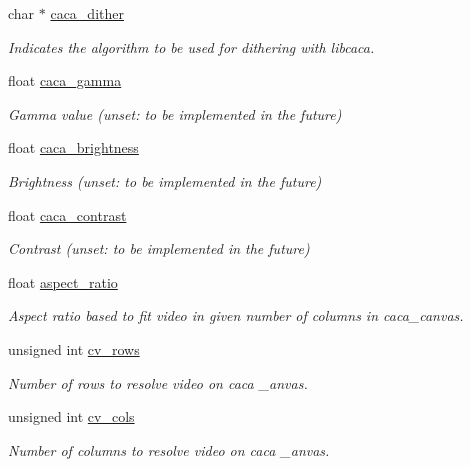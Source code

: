 \begin{DoxyCompactItemize}
char $\ast$ \hyperlink{structvideo__params__s_ac064547d5eda8f8516a88922ca28ae5c}{caca\-\_\-dither}
\begin{DoxyCompactList}\small\item\em \-Indicates the algorithm to be used for dithering with libcaca. \end{DoxyCompactList}\item 
float \hyperlink{structvideo__params__s_a041f29eefbb3860f3b56eb94d96a8f94}{caca\-\_\-gamma}
\begin{DoxyCompactList}\small\item\em \-Gamma value (unset\-: to be implemented in the future) \end{DoxyCompactList}\item 
float \hyperlink{structvideo__params__s_ab2e01e01864e7fb07fdc3ec727edf8ab}{caca\-\_\-brightness}
\begin{DoxyCompactList}\small\item\em \-Brightness (unset\-: to be implemented in the future) \end{DoxyCompactList}\item 
float \hyperlink{structvideo__params__s_aa080edd1e1614a24f4496118ae33bfbc}{caca\-\_\-contrast}
\begin{DoxyCompactList}\small\item\em \-Contrast (unset\-: to be implemented in the future) \end{DoxyCompactList}\item 
float \hyperlink{structvideo__params__s_a1b7019b0aa1838ed55f41cd299cd7fb3}{aspect\-\_\-ratio}
\begin{DoxyCompactList}\small\item\em \-Aspect ratio based to fit video in given number of columns in caca\-\_\-canvas. \end{DoxyCompactList}\item 
unsigned int \hyperlink{structvideo__params__s_aec78c2ac6a99bfb627d77fe7c533541d}{cv\-\_\-rows}
\begin{DoxyCompactList}\small\item\em \-Number of rows to resolve video on caca \-\_\-anvas. \end{DoxyCompactList}\item 
unsigned int \hyperlink{structvideo__params__s_aa3f695f161a6cc97cdbfbcc7405323ec}{cv\-\_\-cols}
\begin{DoxyCompactList}\small\item\em \-Number of columns to resolve video on caca \-\_\-anvas. \end{DoxyCompactList}\end{DoxyCompactItemize}


